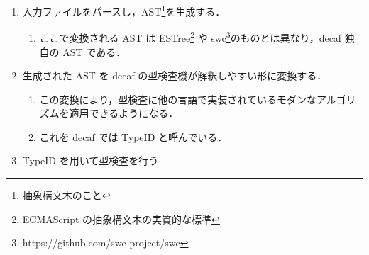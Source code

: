 \begin{enumerate}
    \item 入力ファイルをパースし，AST\footnote{抽象構文木のこと}を生成する．
          \begin{enumerate}
              \item ここで変換される AST は ESTree\footnote{ECMAScript の抽象構文木の実質的な標準} や swc\footnote{https://github.com/swc-project/swc}のものとは異なり，decaf 独自の AST である．
          \end{enumerate}
    \item 生成された AST を decaf の型検査機が解釈しやすい形に変換する．
          \begin{enumerate}
              \item この変換により，型検査に他の言語で実装されているモダンなアルゴリズムを適用できるようになる．
              \item これを decaf では TypeID と呼んでいる．
          \end{enumerate}
    \item TypeID を用いて型検査を行う
\end{enumerate}

